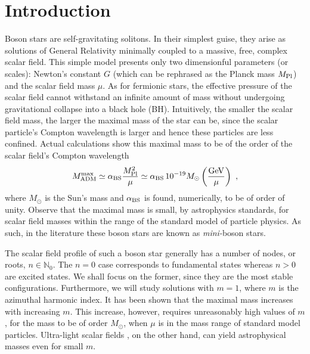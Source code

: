 \section{Introduction}
Boson stars are self-gravitating solitons.
In their simplest guise, they arise as solutions of General Relativity minimally coupled to a massive, free, complex scalar field\cite{Kaup:1968zz,Ruffini:1969qy}.
This simple model presents only two dimensionful parameters (or scales): Newton's constant $G$ (which can be rephrased as the Planck mass $M_{\rm Pl}$) and the scalar field mass $\mu$.
As for fermionic stars, the effective pressure of the scalar field cannot withstand an infinite amount of mass without undergoing gravitational collapse into a black hole (BH).
Intuitively, the smaller the scalar field mass, the larger the maximal mass of the star can be, since the scalar particle's Compton wavelength is larger and hence these particles are less confined. 
Actual calculations show this maximal mass to be of the order of the scalar field's Compton wavelength
\begin{equation}
 M_{\rm ADM}^{\rm max}\simeq \alpha_{\rm BS} \frac{M_{\rm Pl}^2}{\mu}\simeq \alpha_{\rm BS} \, 10^{-19}M_\odot\left(\frac{\rm GeV}{\mu}\right)\ , 
\label{mini}
\end{equation}
where $M_{\odot}$ is the Sun's mass and $\alpha_{\rm BS}$ is found, numerically, to be of order of unity.
Observe that the maximal mass is small, by astrophysics standards, for scalar field masses within the range of the standard model of particle physics.
As such, in the literature these boson stars are known as \textit{mini-}boson stars\cite{Schunck:2003kk}. 

The scalar field profile of such a boson star generally has a number of nodes, or roots, $n\in \mathbb{N}_0$. The $n=0$ case corresponds to fundamental states whereas $n>0$ are excited states. We shall focus on the former, since they are the most stable configurations.
Furthermore, we will study solutions with $m=1$, where $m$ is the azimuthal harmonic index.
It has been shown that the maximal mass increases with increasing $m$.\cite{Liebling:2012fv,Yoshida:1997qf,Grandclement:2014msa}
This increase, however, requires  unreasonably high values of $m$, for the mass to be of order $M_{\odot}$, when $\mu$ is in the mass range of standard model particles. Ultra-light scalar fields
, on the other hand, can yield astrophysical masses even for small $m$. 

